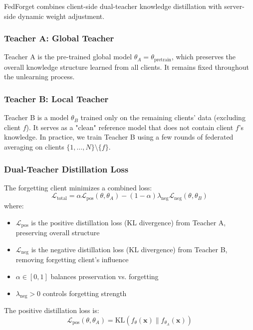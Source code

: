 \documentclass[10pt,twocolumn]{article}
\begin{document}
FedForget combines client-side dual-teacher knowledge distillation with server-side dynamic weight adjustment.

\subsubsection{Teacher A: Global Teacher}

Teacher A is the pre-trained global model $\theta_A = \theta_{\text{pretrain}}$, which preserves the overall knowledge structure learned from all clients. It remains fixed throughout the unlearning process.

\subsubsection{Teacher B: Local Teacher}

Teacher B is a model $\theta_B$ trained only on the remaining clients' data (excluding client $f$). It serves as a "clean" reference model that does not contain client $f$'s knowledge. In practice, we train Teacher B using a few rounds of federated averaging on clients $\{1, \ldots, N\} \setminus \{f\}$.

\subsubsection{Dual-Teacher Distillation Loss}

The forgetting client minimizes a combined loss:
\begin{equation}
\mathcal{L}_{\text{total}} = \alpha \mathcal{L}_{\text{pos}}(\theta, \theta_A) - (1-\alpha) \lambda_{\text{neg}} \mathcal{L}_{\text{neg}}(\theta, \theta_B)
\end{equation}
where:
\begin{itemize}
\item $\mathcal{L}_{\text{pos}}$ is the positive distillation loss (KL divergence) from Teacher A, preserving overall structure
\item $\mathcal{L}_{\text{neg}}$ is the negative distillation loss (KL divergence) from Teacher B, removing forgetting client's influence
\item $\alpha \in [0,1]$ balances preservation vs. forgetting
\item $\lambda_{\text{neg}} > 0$ controls forgetting strength
\end{itemize}

The positive distillation loss is:
\begin{equation}
\mathcal{L}_{\text{pos}}(\theta, \theta_A) = \text{KL}(f_\theta(\mathbf{x}) \| f_{\theta_A}(\mathbf{x}))
\end{equation}
\end{document}
